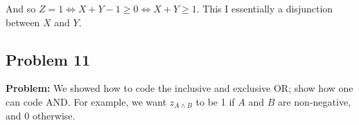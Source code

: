 \documentclass{article}
\begin{document}
And so $Z=1\iff X+Y-1\ge 0\iff X+Y\ge 1$. This I essentially a disjunction between $X$ and $Y$.

\subsection*{Problem 11}
\noindent\textbf{Problem:} We showed how to code the inclusive and exclusive OR; show how one can code AND. For example, we want $z_{A\wedge B}$ to be 1 if $A$ and $B$ are non-negative, and 0 otherwise.
\bigskip






\end{document}
